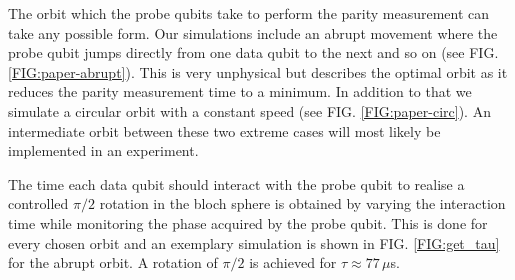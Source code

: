 The orbit which the probe qubits take to perform the parity measurement can take any possible form. Our simulations include an abrupt movement where the probe qubit jumps directly from one data qubit to the next and so on (see FIG. \ref{FIG:paper-abrupt}). This is very unphysical but describes the optimal orbit as it reduces the parity measurement time to a minimum. In addition to that we simulate a circular orbit with a constant speed (see FIG. \ref{FIG:paper-circ}). An intermediate orbit between these two extreme cases will most likely be implemented in an experiment. 

The time each data qubit should interact with the probe qubit to realise a controlled $\pi/2$ rotation in the bloch sphere is obtained by varying the interaction time while monitoring the phase acquired by the probe qubit. This is done for every chosen orbit and an exemplary simulation is shown in FIG. \ref{FIG:get_tau} for the abrupt orbit. A rotation of $\pi/2$ is achieved for $\tau\approx 77\, \mu$s.


